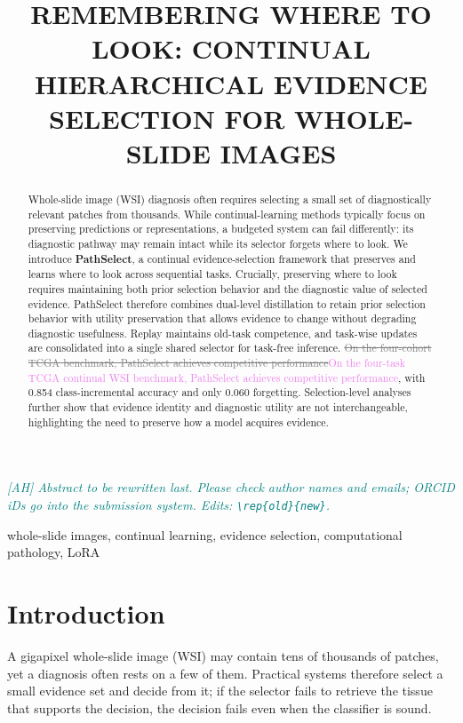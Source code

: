 \documentclass{article}
\title{REMEMBERING WHERE TO LOOK: CONTINUAL HIERARCHICAL EVIDENCE SELECTION FOR WHOLE-SLIDE IMAGES}
\newif\ifmarkup \markuptrue
\newcommand{\note}[1]{\textcolor{teal}{\textit{[AH] #1}}}     %
\newcommand{\repc}[3]{\ifmarkup\textcolor{gray}{\sout{#2}}\textcolor{#1}{#3}\else#3\fi}
\newcommand{\repP}[2]{\repc{violet}{#1}{#2}}  %
\begin{document}
\ninept
\maketitle

\note{Abstract to be rewritten last. Please check author names and emails; ORCID iDs go into the submission system. Edits: \texttt{\textbackslash rep\{old\}\{new\}}.}

\begin{abstract}
Whole-slide image (WSI) diagnosis often requires selecting a small set of diagnostically relevant patches from thousands. While continual-learning methods typically focus on preserving predictions or representations, a budgeted system can fail differently: its diagnostic pathway may remain intact while its selector forgets where to look. We introduce \textbf{PathSelect}, a continual evidence-selection framework that preserves and learns where to look across sequential tasks. Crucially, preserving where to look requires maintaining both prior selection behavior and the diagnostic value of selected evidence. PathSelect therefore combines dual-level distillation to retain prior selection behavior with utility preservation that allows evidence to change without degrading diagnostic usefulness. Replay maintains old-task competence, and task-wise updates are consolidated into a single shared selector for task-free inference. \repP{On the four-cohort TCGA benchmark, PathSelect achieves competitive performance}{On the four-task TCGA continual WSI benchmark, PathSelect achieves competitive performance}, with 0.854 class-incremental accuracy and only 0.060 forgetting. Selection-level analyses further show that evidence identity and diagnostic utility are not interchangeable, highlighting the need to preserve how a model acquires evidence.
\end{abstract}

\begin{keywords}
whole-slide images, continual learning, evidence selection, computational pathology, LoRA
\end{keywords}

\section{Introduction}
\label{sec:intro}

A gigapixel whole-slide image (WSI) may contain tens of thousands of patches, yet a diagnosis often rests on a few of them. Practical systems therefore select a small evidence set and decide from it; if the selector fails to retrieve the tissue that supports the decision, the decision fails even when the classifier is sound.
\end{document}
